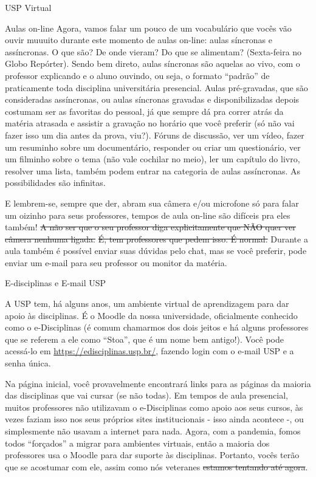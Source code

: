 \begin{secao}{USP Virtual}
\begin{subsecao}{Aulas on-line}
Agora, vamos falar um pouco de um vocabulário que vocês vão ouvir muuuito durante
este momento de aulas on-line: aulas síncronas e assíncronas. O que são? De onde vieram?
Do que se alimentam? (Sexta-feira no Globo Repórter). Sendo bem direto, aulas síncronas
são aquelas ao vivo, com o professor explicando e o aluno ouvindo, ou seja, o formato
``padrão'' de praticamente toda disciplina universitária presencial. Aulas pré-gravadas,
que são consideradas assíncronas, ou aulas síncronas gravadas e disponibilizadas depois
costumam ser as favoritas do pessoal, já que sempre dá pra correr atrás da matéria atrasada
e assistir a gravação no horário que você preferir (só não vai fazer isso um dia antes
da prova, viu?). Fóruns de discussão, ver um vídeo, fazer um resuminho sobre um
documentário, responder ou criar um questionário, ver um filminho sobre o tema
(não vale cochilar no meio), ler um capítulo do livro, resolver uma lista, também podem
entrar na categoria de aulas assíncronas. As possibilidades são infinitas.

E lembrem-se, sempre que der, abram sua câmera e/ou microfone só para falar um oizinho
para seus professores, tempos de aula on-line são difíceis pra eles também!
\sout{A não ser que o seu professor diga explicitamente que NÃO quer ver câmera nenhuma ligada.}
\sout{É, tem professores que pedem isso. É normal.} Durante a aula também é possível
enviar suas dúvidas pelo chat, mas se você preferir, pode enviar um e-mail para seu
professor ou monitor da matéria.

\end{subsecao}

\begin{subsecao}{E-disciplinas e E-mail USP}

A USP tem, há alguns anos, um ambiente virtual de aprendizagem para dar apoio
às disciplinas. É o Moodle da nossa universidade, oficialmente conhecido como
o e-Disciplinas (é comum chamarmos dos dois jeitos e há alguns professores que
se referem a ele como ``Stoa'', que é um nome bem antigo!). Você pode acessá-lo em
\url{https://edisciplinas.usp.br/}, fazendo login com o e-mail USP e a senha única.

Na página inicial, você provavelmente encontrará links para as páginas da maioria
das disciplinas que vai cursar (se não todas). Em tempos de aula presencial, muitos
professores não utilizavam o e-Disciplinas como apoio aos seus cursos, às vezes
faziam isso nos seus próprios sites institucionais - isso ainda acontece -, ou
simplesmente não usavam a internet para nada. Agora, com a pandemia, fomos todos
``forçados'' a migrar para ambientes virtuais, então a maioria dos professores usa o
Moodle para dar suporte às disciplinas. Portanto, vocês terão que se acostumar com ele,
assim como nós veteranes \sout{estamos tentando até agora}.


\end{subsecao}
\end{secao}
